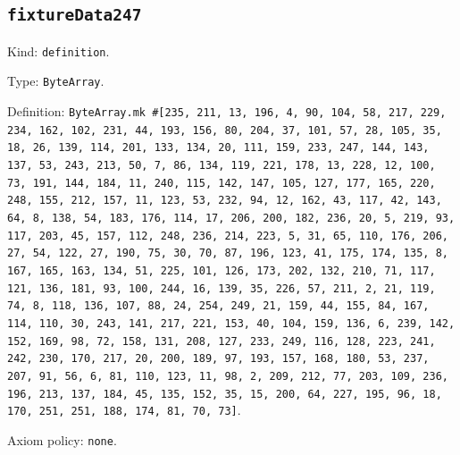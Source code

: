 \documentclass[11pt]{article}
\begin{document}
\subsection*{\texttt{fixtureData247}}
\noindent Kind: \texttt{definition}.\par
\noindent Type: \texttt{ByteArray}.\par
\noindent Definition: \texttt{ByteArray.mk \#[235, 211, 13, 196, 4, 90, 104, 58, 217, 229, 234, 162, 102, 231, 44, 193, 156, 80, 204, 37, 101, 57, 28, 105, 35, 18, 26, 139, 114, 201, 133, 134, 20, 111, 159, 233, 247, 144, 143, 137, 53, 243, 213, 50, 7, 86, 134, 119, 221, 178, 13, 228, 12, 100, 73, 191, 144, 184, 11, 240, 115, 142, 147, 105, 127, 177, 165, 220, 248, 155, 212, 157, 11, 123, 53, 232, 94, 12, 162, 43, 117, 42, 143, 64, 8, 138, 54, 183, 176, 114, 17, 206, 200, 182, 236, 20, 5, 219, 93, 117, 203, 45, 157, 112, 248, 236, 214, 223, 5, 31, 65, 110, 176, 206, 27, 54, 122, 27, 190, 75, 30, 70, 87, 196, 123, 41, 175, 174, 135, 8, 167, 165, 163, 134, 51, 225, 101, 126, 173, 202, 132, 210, 71, 117, 121, 136, 181, 93, 100, 244, 16, 139, 35, 226, 57, 211, 2, 21, 119, 74, 8, 118, 136, 107, 88, 24, 254, 249, 21, 159, 44, 155, 84, 167, 114, 110, 30, 243, 141, 217, 221, 153, 40, 104, 159, 136, 6, 239, 142, 152, 169, 98, 72, 158, 131, 208, 127, 233, 249, 116, 128, 223, 241, 242, 230, 170, 217, 20, 200, 189, 97, 193, 157, 168, 180, 53, 237, 207, 91, 56, 6, 81, 110, 123, 11, 98, 2, 209, 212, 77, 203, 109, 236, 196, 213, 137, 184, 45, 135, 152, 35, 15, 200, 64, 227, 195, 96, 18, 170, 251, 251, 188, 174, 81, 70, 73]}.\par
\noindent Axiom policy: \texttt{none}.\par
\end{document}
